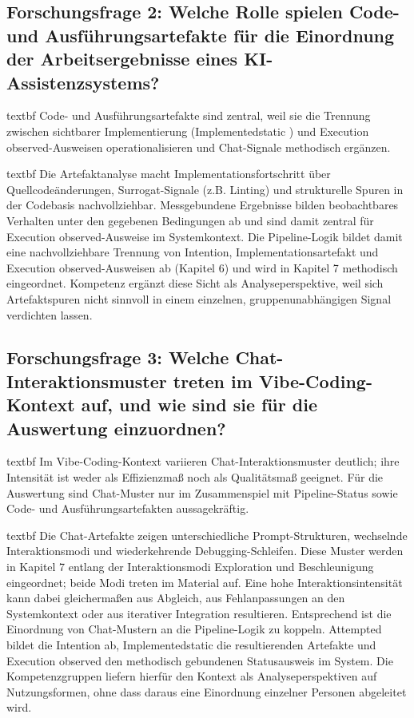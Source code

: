 \subsection[Forschungsfrage 2: Code- und Ausführungsartefakte]{Forschungsfrage 2: Welche Rolle spielen Code- und Ausführungsartefakte für die Einordnung der Arbeitsergebnisse eines KI-Assistenzsystems?}

\noindent \csname textbf Code- und Ausführungsartefakte sind zentral, weil sie die Trennung zwischen sichtbarer Implementierung (Implementedstatic ) und Execution observed-Ausweisen operationalisieren und Chat-Signale methodisch ergänzen.

\csname textbf Die Artefaktanalyse macht Implementationsfortschritt über Quellcodeänderungen, Surrogat-Signale (z.B. Linting) und strukturelle Spuren in der Codebasis nachvollziehbar. Messgebundene Ergebnisse bilden beobachtbares Verhalten unter den gegebenen Bedingungen ab und sind damit zentral für Execution observed-Ausweise im Systemkontext. Die Pipeline-Logik bildet damit eine nachvollziehbare Trennung von Intention, Implementationsartefakt und Execution observed-Ausweisen ab (Kapitel 6) und wird in Kapitel 7 methodisch eingeordnet. Kompetenz ergänzt diese Sicht als Analyseperspektive, weil sich Artefaktspuren nicht sinnvoll in einem einzelnen, gruppenunabhängigen Signal verdichten lassen.

\subsection[Forschungsfrage 3: Chat-Interaktionsmuster]{Forschungsfrage 3: Welche Chat-Interaktionsmuster treten im Vibe-Coding-Kontext auf, und wie sind sie für die Auswertung einzuordnen?}

\noindent \csname textbf Im Vibe-Coding-Kontext variieren Chat-Interaktionsmuster deutlich; ihre Intensität ist weder als Effizienzmaß noch als Qualitätsmaß geeignet. Für die Auswertung sind Chat-Muster nur im Zusammenspiel mit Pipeline-Status sowie Code- und Ausführungsartefakten aussagekräftig.

\csname textbf Die Chat-Artefakte zeigen unterschiedliche Prompt-Strukturen, wechselnde Interaktionsmodi und wiederkehrende Debugging-Schleifen. Diese Muster werden in Kapitel 7 entlang der Interaktionsmodi Exploration und Beschleunigung eingeordnet; beide Modi treten im Material auf. Eine hohe Interaktionsintensität kann dabei gleichermaßen aus Abgleich, aus Fehlanpassungen an den Systemkontext oder aus iterativer Integration resultieren. Entsprechend ist die Einordnung von Chat-Mustern an die Pipeline-Logik zu koppeln. Attempted bildet die Intention ab, Implementedstatic die resultierenden Artefakte und Execution observed den methodisch gebundenen Statusausweis im System. Die Kompetenzgruppen liefern hierfür den Kontext als Analyseperspektiven auf Nutzungsformen, ohne dass daraus eine Einordnung einzelner Personen abgeleitet wird.

